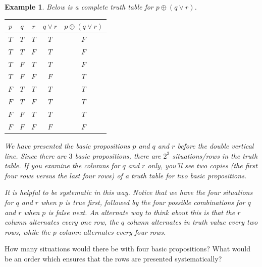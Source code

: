 \documentclass{book}
\newcounter{ekcounter}%
\theoremstyle{ekimcustom}
\newtheorem{example}[ekcounter]{Example}
\begin{document}
\begin{example}
Below is a complete truth table for $p \oplus (q \vee r)$.
\begin{center}
\begin{tabular}{c|c|c||c|c}
$p$ & $q$ & $r$  & $q \vee r$ & $p \oplus (q \vee r)$ \\\hline
$T $ & $T $ & $T $ & $T $ & $F $ \\
$T $ & $T $ & $F $ & $T $ & $F $ \\
$T $ & $F $ & $T $ & $T $ & $F $ \\
$T $ & $F $ & $F $ & $F $ & $T$ \\
$F $ & $T $ & $T $ & $T $ & $T $ \\
$F $ & $T $ & $F $ & $T $ & $T $ \\
$F $ & $F $ & $T $ & $T $ & $ T$ \\
$F $ & $F $ & $F $ & $F $ & $F $
\end{tabular}
\end{center}
We have presented the basic propositions $p$ and $q$ and $r$ before the double vertical line. Since there are $3$ basic propositions, there are $2^3$ situations/rows in the truth table. If you examine the columns for $q$ and $r$ only, you'll see two copies (the first four rows versus the last four rows) of a truth table for two basic propositions.

It is helpful to be systematic in this way. Notice that we have the four situations for $q$ and $r$ when $p$ is true first, followed by the four possible combinations for $q$ and $r$ when $p$ is false next. An alternate way to think about this is that the $r$ column alternates every one row, the $q$ column alternates in truth value every two rows, while the $p$ column alternates every four rows.
\end{example}
How many situations would there be with four basic propositions? What would be an order which ensures that the rows are presented systematically?
\end{document}

